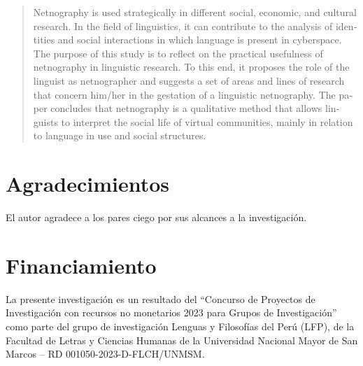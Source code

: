 \documentclass[spanish]{textolivre}
\begin{document}
\begin{polyabstract}
\begin{english}
\begin{abstract}
    Netnography is used strategically in different social, economic, and cultural research. In the field of linguistics, it can contribute to the analysis of identities and social interactions in which language is present in cyberspace. The purpose of this study is to reflect on the practical usefulness of netnography in linguistic research. To this end, it proposes the role of the linguist as netnographer and suggests a set of areas and lines of research that concern him/her in the gestation of a linguistic netnography. The paper concludes that netnography is a qualitative method that allows linguists to interpret the social life of virtual communities, mainly in relation to language in use and social structures.

\end{abstract}
\end{english}
\end{polyabstract}







\section{Agradecimientos}
El autor agradece a los pares ciego por sus alcances a la investigación.

\section{Financiamiento}
La presente investigación es un resultado del “Concurso de Proyectos de Investigación con recursos no monetarios 2023 para Grupos de Investigación” como parte del grupo de investigación Lenguas y Filosofías del Perú (LFP), de la Facultad de Letras y Ciencias Humanas de la Universidad Nacional Mayor de San Marcos – RD 001050-2023-D-FLCH/UNMSM.


\printbibliography\label{sec-bib}
\end{document}
